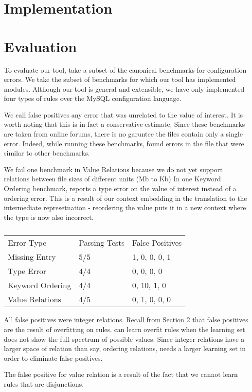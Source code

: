 \section{Implementation}

\section{Evaluation}

To evaluate our tool, take a subset of the canonical benchmarks for configuration errors\cite{dataset}.
We take the subset of benchmarks for which our tool has implemented modules.
Although our tool is general and extensible, we have only implemented four types of rules over the MySQL configuration language.

We call false positives any error that was unrelated to the value of interest.
It is worth noting that this is in fact a conservative estimate.
Since these benchmarks are taken from online forums, there is no garuntee the files contain only a single error.
Indeed, while running these benchmarks, \app found errors in the file that were similar to other benchmarks. 

We fail one benchmark in Value Relations because we do not yet support relations between file sizes of different units (Mb to Kb)
In one Keyword Ordering benchmark, \app reports a type error on the value of interest instead of a ordering error.
This is a result of our context embedding in the translation to the intermediate represetnation - reordering the value puts it in a new context where the type is now also incorrect.

\begin{table}[]
\centering
\caption{}
\label{my-label}
\begin{tabular}{l|l|l}
Error Type       & Passing Tests & False Positives  \\ \hhline{|=|=|=|}
Missing Entry    & 5/5           & 1, 0, 0, 0, 1        \\ \hline
Type Error       & 4/4           & 0, 0, 0, 0          \\ \hline
Keyword Ordering & 4/4          & 0, 10, 1, 0         \\ \hline
Value Relations  & 4/5           & 0, 1, 0, 0, 0        \\ 
\end{tabular}
\end{table}

All false positives were integer relations.
Recall from Section \ref{} that false positives are the result of overfitting on rules.
\app can learn overfit rules when the learning set does not show the full spectrum of possible values.
Since integer relations have a larger space of relation than say, ordering relations, \app needs a larger learning set in order to eliminate false positives.

The false positive for value relation is a result of the fact that we cannot learn rules that are disjunctions.

